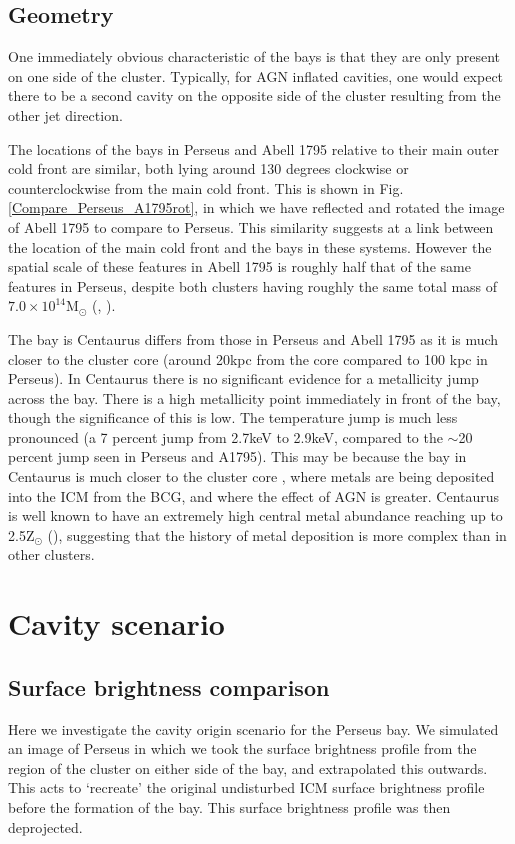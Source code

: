 \documentclass[useAMS,usenatbib]{mn2e}
\begin{document}
\subsection{Geometry}

One immediately obvious characteristic of the bays is that they are only present on one side of the cluster. Typically, for AGN inflated cavities, 
one would expect there to be a second cavity on the opposite
side of the cluster resulting from the other jet direction. 

The locations of the bays in Perseus and Abell 1795 relative to their main outer cold front are similar, both lying 
around 130 degrees clockwise or counterclockwise from the main cold front. This is shown in Fig. \ref{Compare_Perseus_A1795rot},
in which we have reflected and rotated the image of Abell 1795 to compare to Perseus. This similarity suggests at a link between
the location of the main cold front and the bays in these systems. However the spatial scale of these features in Abell 1795 
is roughly half that of the same features in Perseus, despite both clusters having roughly the same total mass of $7.0\times10^{14}$M$_{\odot}$ (\citealt{Bautz2009}, \citealt{Simionescu2011}). 

The bay is Centaurus differs from those in Perseus and Abell 1795 as it is much closer to the cluster core (around
20kpc from the core compared to 100 kpc in Perseus). In Centaurus there is no significant evidence for a metallicity jump across the bay. There is a high metallicity 
point immediately in front of the bay, though the significance of this is low. The
temperature jump is much less pronounced (a 7 percent jump from 2.7keV to
2.9keV, compared to the $\sim$20 percent jump seen in Perseus and A1795). This
may be because the bay in Centaurus is much closer to the cluster core , where metals
are being deposited into the ICM from the BCG, and where the effect of AGN is greater. Centaurus is well known to have
an extremely high central metal abundance reaching up to 2.5Z$_{\odot}$ (\citealt{Fabian2005}), suggesting that the history of metal 
deposition is more complex than in other clusters.


 



\section{Cavity scenario}
\label{sec:cavsim}
\subsection{Surface brightness comparison}
Here we investigate the cavity origin scenario for the Perseus bay. We simulated
an image of Perseus in which we took the surface brightness profile from the
region of the cluster on either side of the bay, and extrapolated this outwards.
This acts to `recreate' the original undisturbed ICM surface brightness profile
before the formation of the bay. This surface brightness profile was then
deprojected. 
\end{document}
